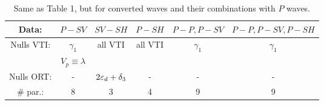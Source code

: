 \begin{table} \label{tab:tradeoffs}
	\begin{tabular}{| c|c | c | c|c |c|}
		\hline
		Data:      &       $P-SV$       & $SV-SH$              & $P-SH$  & $P-P, P-SV$ & $P-P, P-SV, P-SH$ \\ \hline
		Nulls VTI: &     $\gamma_1$     & all VTI              & all VTI & $\gamma_1$  & $\gamma_1$        \\
		           & $V_p\equiv\lambda$ &                      &         &             &                   \\
		Nulls ORT: &         -          & $2\varepsilon_d + \delta_3$ & -       &      -      & -                 \\ \hline
		\# par.:   &         8          & 3                    & 4       &      9      & 9
		\\ \hline
	\end{tabular}
	\caption{Same as Table 1, but for converted waves and their combinations with $P$ waves.}
\end{table}